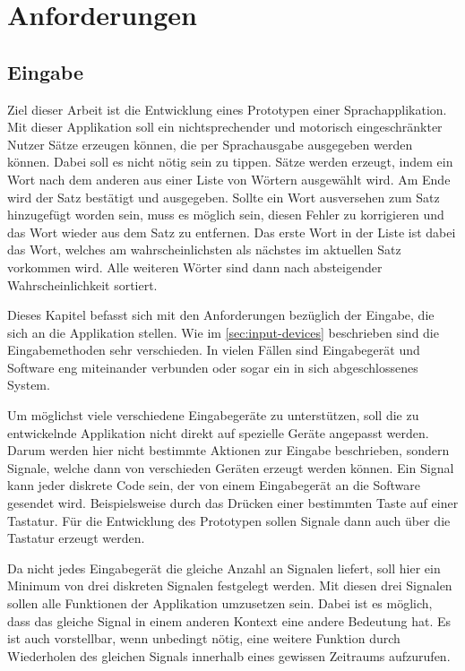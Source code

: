 \section{Anforderungen}
	\label{sec:requirements}
    
	\subsection{Eingabe}
 
    	Ziel dieser Arbeit ist die Entwicklung eines Prototypen einer Sprachapplikation. Mit dieser Applikation soll ein nichtsprechender und motorisch eingeschränkter Nutzer Sätze erzeugen können, die per Sprachausgabe ausgegeben werden können. Dabei soll es nicht nötig sein zu tippen. Sätze werden erzeugt, indem ein Wort nach dem anderen aus einer Liste von Wörtern ausgewählt wird. Am Ende wird der Satz bestätigt und ausgegeben. Sollte ein Wort ausversehen zum Satz hinzugefügt worden sein, muss es möglich sein, diesen Fehler zu korrigieren und das Wort wieder aus dem Satz zu entfernen. Das erste Wort in der Liste ist dabei das Wort, welches am wahrscheinlichsten als nächstes im aktuellen Satz vorkommen wird. Alle weiteren Wörter sind dann nach absteigender Wahrscheinlichkeit sortiert.
         
    	Dieses Kapitel befasst sich mit den Anforderungen bezüglich der Eingabe, die sich an die Applikation stellen. Wie im \autoref{sec:input-devices} beschrieben sind die Eingabemethoden sehr verschieden. In vielen Fällen sind Eingabegerät und Software eng miteinander verbunden oder sogar ein in sich abgeschlossenes System.
        
        Um möglichst viele verschiedene Eingabegeräte zu unterstützen, soll die zu entwickelnde Applikation nicht direkt auf spezielle Geräte angepasst werden. Darum werden hier nicht bestimmte Aktionen zur Eingabe beschrieben, sondern Signale, welche dann von verschieden Geräten erzeugt werden können. Ein Signal kann jeder diskrete Code sein, der von einem Eingabegerät an die Software gesendet wird. Beispielsweise durch das Drücken einer bestimmten Taste auf einer Tastatur. Für die Entwicklung des Prototypen sollen Signale dann auch über die Tastatur erzeugt werden. 
        
        Da nicht jedes Eingabegerät die gleiche Anzahl an Signalen liefert, soll hier ein Minimum von drei diskreten Signalen festgelegt werden. Mit diesen drei Signalen sollen alle Funktionen der Applikation umzusetzen sein. Dabei ist es möglich, dass das gleiche Signal in einem anderen Kontext eine andere Bedeutung hat. Es ist auch vorstellbar, wenn unbedingt nötig, eine weitere Funktion durch Wiederholen des gleichen Signals innerhalb eines gewissen Zeitraums aufzurufen. 
        
